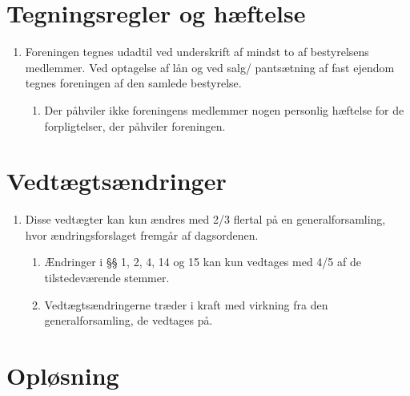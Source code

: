 \documentclass[a4paper]{article}
\newenvironment{stykenum}{
  \begin{enumerate}[%
    label=Stk.~\arabic*., ref=\theenumi~Stk.~\arabic*, start=2]
}{\end{enumerate}}
\begin{document}
\section*{Tegningsregler og hæftelse}

\begin{enumerate}[resume*=afsnit]

\item Foreningen tegnes udadtil ved underskrift af mindst to af bestyrelsens
medlemmer. Ved optagelse af lån og ved salg/ pantsætning af fast ejendom tegnes
foreningen af den samlede bestyrelse.

  \begin{stykenum}

  \item Der påhviler ikke foreningens medlemmer nogen personlig hæftelse for de
        forpligtelser, der påhviler foreningen.

  \end{stykenum}

\end{enumerate}


\section*{Vedtægtsændringer}

\begin{enumerate}[resume*=afsnit]

\item Disse vedtægter kan kun ændres med 2/3 flertal på en generalforsamling,
hvor ændringsforslaget fremgår af dagsordenen.

  \begin{stykenum}

  \item Ændringer i §§ 1, 2, 4, 14 og 15 kan kun vedtages med 4/5 af de
        tilstedeværende stemmer.

  \item Vedtægtsændringerne træder i kraft med virkning fra den
        generalforsamling, de vedtages på.

  \end{stykenum}

\end{enumerate}


\section*{Opløsning}
\end{document}

